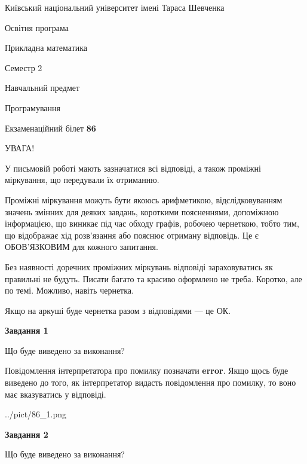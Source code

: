 \documentclass[12pt, ukrainian]{article}
\begin{document}
{{\begin {small}\par
{ \center  Київський національний університет імені Тараса Шевченка \par}
{\parbox {5 cm}{Освітня програма \hfill}{\parbox {7 cm}{Прикладна математика \hfill}}\parbox {6 cm}{\hfill Семестр 2}}\par
{\parbox {5 cm} {Навчальний предмет \hfill}\parbox {7 cm}{Програмування \hfill}\parbox {6cm}{\hfill}\par}\vspace{-7pt} \end{small}}{\center Екзаменаційний білет \No \textbf
{ 86 }\par}}
{
\begin {large}
УВАГА!

У письмовій роботі мають зазначатися всі відповіді, а також проміжні міркування, що передували їх отриманню.

Проміжні міркування можуть бути якоюсь арифметикою, відслідковуванням зна\-чень змінних для деяких завдань,
короткими поясненнями, допоміжною інформацією, що виникає під час обходу графів, робочею чернеткою,
тобто тим, що відображає хід розв’язання або пояснює отриману відповідь.
Це є ОБОВ’ЯЗКОВИМ для кожного запитання.

Без наявності доречних проміжних міркувань відповіді зараховуватись як правиль\-ні не будуть.
Писати багато та красиво оформлено не треба. Коротко, але по темі. Можли\-во, навіть чернетка.

Якщо на аркуші буде чернетка разом з відповідями --- це ОК.

\newpage

{\begin {center}\textbf{Завдання 1}\end {center}}\par
Що буде виведено за виконання?

Повідомлення інтерпретатора про помилку позначати \textbf{error}.
Якщо щось буде виведено до того, як інтерпретатор видасть повідомлення про помилку, 
то воно має вказуватись у відповіді. \par


\begin{center}
	{../pict/86_1.png}
\end{center}
\newpage

{\begin {center}\textbf{Завдання 2}\end {center}}\par
Що буде виведено за виконання?


\end{large}}
\end{document}
